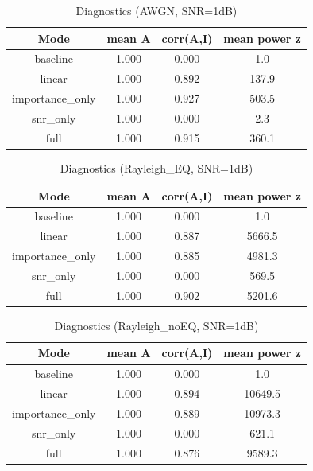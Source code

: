 \begin{table}[h]
\centering
\caption{Diagnostics (AWGN, SNR=1dB)}
\begin{tabular}{c|c|c|c}
\hline
Mode & mean A & corr(A,I) & mean power z \\ \hline
baseline & 1.000 & 0.000 & 1.0 \\
linear & 1.000 & 0.892 & 137.9 \\
importance_only & 1.000 & 0.927 & 503.5 \\
snr_only & 1.000 & 0.000 & 2.3 \\
full & 1.000 & 0.915 & 360.1 \\
\hline
\end{tabular}
\end{table}
\begin{table}[h]
\centering
\caption{Diagnostics (Rayleigh_EQ, SNR=1dB)}
\begin{tabular}{c|c|c|c}
\hline
Mode & mean A & corr(A,I) & mean power z \\ \hline
baseline & 1.000 & 0.000 & 1.0 \\
linear & 1.000 & 0.887 & 5666.5 \\
importance_only & 1.000 & 0.885 & 4981.3 \\
snr_only & 1.000 & 0.000 & 569.5 \\
full & 1.000 & 0.902 & 5201.6 \\
\hline
\end{tabular}
\end{table}
\begin{table}[h]
\centering
\caption{Diagnostics (Rayleigh_noEQ, SNR=1dB)}
\begin{tabular}{c|c|c|c}
\hline
Mode & mean A & corr(A,I) & mean power z \\ \hline
baseline & 1.000 & 0.000 & 1.0 \\
linear & 1.000 & 0.894 & 10649.5 \\
importance_only & 1.000 & 0.889 & 10973.3 \\
snr_only & 1.000 & 0.000 & 621.1 \\
full & 1.000 & 0.876 & 9589.3 \\
\hline
\end{tabular}
\end{table}
